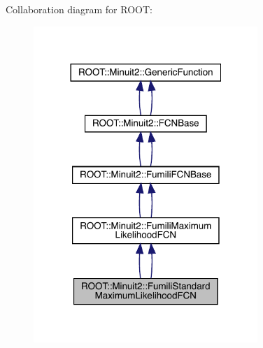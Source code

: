 Collaboration diagram for R\+O\+OT\+:\nopagebreak
\begin{figure}[H]
\begin{center}
\leavevmode
\includegraphics[width=240pt]{d2/dde/classROOT_1_1Minuit2_1_1FumiliStandardMaximumLikelihoodFCN__coll__graph}
\end{center}
\end{figure}
